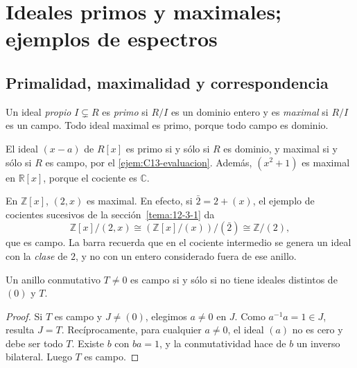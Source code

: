 \section{Ideales primos y maximales; ejemplos de espectros}\label{sec:anillos-primos}

\subsection{Primalidad, maximalidad y correspondencia}\label{tema:13-1-2}
\begin{defi}
Un ideal \emph{propio} $I\subsetneq R$ es \emph{primo} si $R/I$ es un dominio entero y es \emph{maximal} si $R/I$ es un campo. Todo ideal maximal es primo, porque todo campo es dominio.
\end{defi}

\begin{ejem}
El ideal $(x-a)$ de $R[x]$ es primo si y sólo si $R$ es dominio, y maximal si y sólo si $R$ es campo, por el \cref{ejem:C13-evaluacion}. Además, $(x^2+1)$ es maximal en $\mathbb R[x]$, porque el cociente es $\mathbb C$.

En $\mathbb Z[x]$, $(2,x)$ es maximal. En efecto, si $\bar2=2+(x)$, el ejemplo de cocientes sucesivos de la sección~\ref{tema:12-3-1} da
\[
\mathbb Z[x]/(2,x)
\cong (\mathbb Z[x]/(x))/(\bar2)
\cong\mathbb Z/(2),
\]
que es campo. La barra recuerda que en el cociente intermedio se genera un ideal con la \emph{clase} de $2$, y no con un entero considerado fuera de ese anillo.
\end{ejem}

\begin{lema}\label{lema:C13-campo}
Un anillo conmutativo $T\ne0$ es campo si y sólo si no tiene ideales distintos de $(0)$ y $T$.
\end{lema}
\begin{proof}
Si $T$ es campo y $J\ne(0)$, elegimos $a\ne0$ en $J$. Como $a^{-1}a=1\in J$, resulta $J=T$. Recíprocamente, para cualquier $a\ne0$, el ideal $(a)$ no es cero y debe ser todo $T$. Existe $b$ con $ba=1$, y la conmutatividad hace de $b$ un inverso bilateral. Luego $T$ es campo.
\end{proof}

